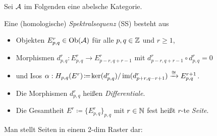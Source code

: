 \documentclass{cheat-sheet}
\begin{document}

Sei $\mathcal{A}$ im Folgenden eine abelsche Kategorie.

\begin{defn}
  Eine (homologische) \emph{Spektralsequenz} (SS) besteht aus
  \begin{itemize}
    \item Objekten $E^r_{p,q} \in \operatorname{Ob}(\mathcal{A})$ für alle $p, q \in \mathbb{Z}$ und $r \geq 1$,
    \item Morphismen $d^r_{p,q} : E^r_{p,q} \to E^r_{p-r,q+r-1}$ mit $d^r_{p-r,q+r-1} \circ d^r_{p,q} = 0$
    \item und Isos $\alpha : H_{p,q}(E^r) \!\coloneqq\! \ker(d^r_{p,q}) / \operatorname{im}(d^r_{p+r,q-r+1}) \xrightarrow{\cong} E^{r+1}_{p,q}$.
  \end{itemize}
\end{defn}


\begin{sprech}
  \begin{itemize}
    \item Die Morphismen $d^r_{p,q}$ heißen \emph{Differentiale}.
    \item Die Gesamtheit $E^r \coloneqq \{ E^r_{p,q} \}_{p,q}$ mit $r \in \mathbb{N}$ fest heißt $r$-te \emph{Seite}.
  \end{itemize}
\end{sprech}

\begin{bem}
  Man stellt Seiten in einem 2-dim Raster dar:
\end{bem}
\end{document}
